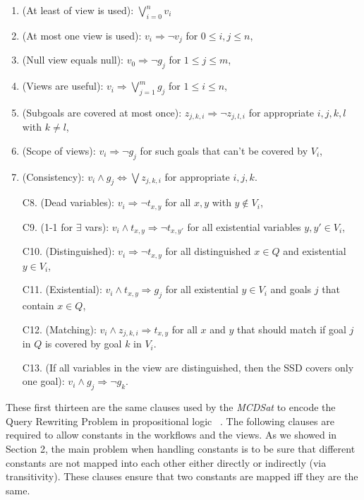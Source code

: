 \documentclass{llncs}
\newcommand{\denselist}{\topsep 0pt \itemsep -4pt}
\begin{document}
\begin{enumerate}[C1.]\denselist
\item (At least of view is used): $\bigvee_{i=0}^n v_i$
\item (At most one view is used): $v_i \Rightarrow \neg v_j$ for $0\leq i,j \leq n$,
\item (Null view equals null): $v_0 \Rightarrow \neg g_j$ for $1\leq j\leq m$,
\item (Views are useful): $v_i \Rightarrow \bigvee_{j=1}^m g_j$ for $1\leq i\leq n$,
\item (Subgoals are covered at most once): $z_{j,k,i} \Rightarrow \neg z_{j,l,i}$ for
      appropriate $i,j,k,l$ with $k\neq l$,
\item (Scope of views): $v_i \Rightarrow \neg g_j$ for such goals that can't be covered by $V_i$,
\item (Consistency): $v_i \land g_j \Leftrightarrow \bigvee z_{j,k,i}$ for appropriate $i,j,k$.
\item[C8.] (Dead variables): $v_i \Rightarrow \neg t_{x,y}$ for all $x,y$ with $y\notin V_i$,
\item[C9.] (1-1 for $\exists$ vars): $v_i \land t_{x,y} \Rightarrow \neg t_{x,y'}$ for all
           existential variables $y,y'\in V_i$,
\item[C10.] (Distinguished): $v_i \Rightarrow \neg t_{x,y}$ for all distinguished $x\in Q$ and
            existential $y\in V_i$,
\item[C11.] (Existential): $v_i \land t_{x,y} \Rightarrow g_j$ for all existential $y\in V_i$ and
            goals $j$ that contain $x\in Q$,
\item[C12.] (Matching): $v_i \land z_{j,k,i} \Rightarrow t_{x,y}$ for all $x$ and $y$ that
            should match if goal $j$ in $Q$ is covered by goal $k$ in $V_i$.
\item[C13.] (If all variables in the view are distinguished, then the SSD covers only one goal):
            $v_i \land g_j \Rightarrow \neg g_k$.
\end{enumerate}

These first thirteen are the same clauses used by the {\it MCDSat} to encode the Query Rewriting Problem in propositional logic ~\cite{arvelo:aaai06}. The following clauses are required to allow constants in the workflows and the views. As we showed in Section 2, the main problem when handling constants is to
be sure that different constants are not mapped into each other either directly or indirectly (via transitivity). These clauses ensure that two constants are mapped iff they are the same.
\end{document}
